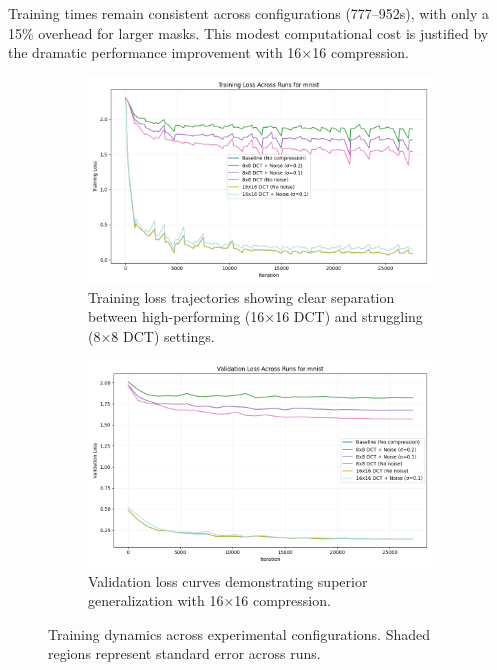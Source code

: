 \documentclass{article} %
\begin{document}
Training times remain consistent across configurations (777--952s), with only a 15\% overhead for larger masks. This modest computational cost is justified by the dramatic performance improvement with 16×16 compression.

\begin{figure}[h]
    \centering
    \begin{subfigure}{0.49\textwidth}
        \includegraphics[width=\textwidth]{train_loss_mnist_across_runs.png}
        \caption{Training loss trajectories showing clear separation between high-performing (16×16 DCT) and struggling (8×8 DCT) settings.}
        \label{fig:train-loss}
    \end{subfigure}
    \hfill
    \begin{subfigure}{0.49\textwidth}
        \includegraphics[width=\textwidth]{val_loss_mnist_across_runs.png}
        \caption{Validation loss curves demonstrating superior generalization with 16×16 compression.}
        \label{fig:val-loss}
    \end{subfigure}
    \caption{Training dynamics across experimental configurations. Shaded regions represent standard error across runs.}
    \label{fig:first_figure}
\end{figure}
\end{document}
